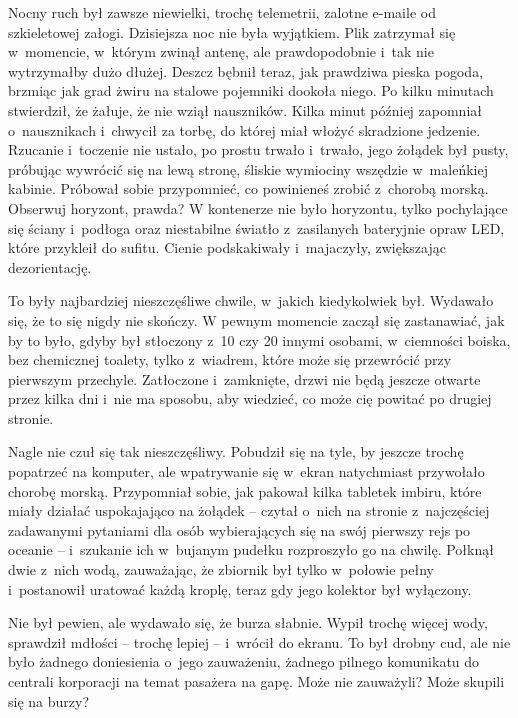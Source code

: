 \documentclass[oneside,polish,11pt,rmheadings]{mwbk}
\begin{document}
Nocny ruch był zawsze niewielki, trochę telemetrii, zalotne e-maile od szkieletowej załogi. Dzisiejsza noc nie była wyjątkiem. Plik zatrzymał się w~momencie, w~którym zwinął antenę, ale prawdopodobnie i~tak nie wytrzymałby dużo dłużej. Deszcz bębnił teraz, jak prawdziwa pieska pogoda, brzmiąc jak grad żwiru na stalowe pojemniki dookoła niego. Po kilku minutach stwierdził, że żałuje, że nie wziął nauszników. Kilka minut później zapomniał o~nausznikach i~chwycił za torbę, do której miał włożyć skradzione jedzenie. Rzucanie i~toczenie nie ustało, po prostu trwało i~trwało, jego żołądek był pusty, próbując wywrócić się na lewą stronę, śliskie wymiociny wszędzie w~maleńkiej kabinie. Próbował sobie przypomnieć, co powinieneś zrobić z~chorobą morską. Obserwuj horyzont, prawda? W kontenerze nie było horyzontu, tylko pochylające się ściany i~podłoga oraz niestabilne światło z~zasilanych bateryjnie opraw LED, które przykleił do sufitu. Cienie podskakiwały i~majaczyły, zwiększając dezorientację.

To były najbardziej nieszczęśliwe chwile, w~jakich kiedykolwiek był. Wydawało się, że to się nigdy nie skończy. W pewnym momencie zaczął się zastanawiać, jak by to było, gdyby był stłoczony z~10 czy 20 innymi osobami, w~ciemności boiska, bez chemicznej toalety, tylko z~wiadrem, które może się przewrócić przy pierwszym przechyle. Zatłoczone i~zamknięte, drzwi nie będą jeszcze otwarte przez kilka dni i~nie ma sposobu, aby wiedzieć, co może cię powitać po drugiej stronie.

Nagle nie czuł się tak nieszczęśliwy. Pobudził się na tyle, by jeszcze trochę popatrzeć na komputer, ale wpatrywanie się w~ekran natychmiast przywołało chorobę morską. Przypomniał sobie, jak pakował kilka tabletek imbiru, które miały działać uspokajająco na żołądek -- czytał o~nich na stronie z~najczęściej zadawanymi pytaniami dla osób wybierających się na swój pierwszy rejs po oceanie -- i~szukanie ich w~bujanym pudełku rozproszyło go na chwilę. Połknął dwie z~nich wodą, zauważając, że zbiornik był tylko w~połowie pełny i~postanowił uratować każdą kroplę, teraz gdy jego kolektor był wyłączony.

Nie był pewien, ale wydawało się, że burza słabnie. Wypił trochę więcej wody, sprawdził mdłości -- trochę lepiej -- i~wrócił do ekranu. To był drobny cud, ale nie było żadnego doniesienia o~jego zauważeniu, żadnego pilnego komunikatu do centrali korporacji na temat pasażera na gapę. Może nie zauważyli? Może skupili się na burzy?
\end{document}
